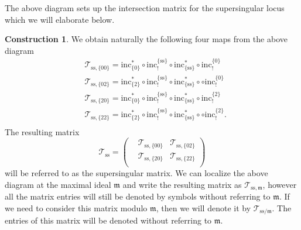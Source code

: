 \documentclass[10pt]{amsart}
\numberwithin{equation}{section}
\theoremstyle{definition}
\newtheorem{construction}[equation]{Construction}
\def\calT{\mathcal{T}}
\def\fracm{\mathfrak{m}}
\begin{document}
The above diagram sets up the intersection matrix for the supersingular locus which we will elaborate below.
\begin{construction}
We obtain naturally the following four maps from the above diagram
\begin{equation*}
\begin{aligned}
&\calT_{\mathrm{ss},\{00\}}= \mathrm{inc}^{\ast}_{\{0\}}\circ \mathrm{inc}^{\{\mathrm{ss}\}}_{!}\circ \mathrm{inc}^{\ast}_{\{\mathrm{ss}\}}\circ\mathrm{inc}^{\{0\}}_{!}\\
&\calT_{\mathrm{ss},\{02\}}= \mathrm{inc}^{\ast}_{\{2\}}\circ  \mathrm{inc}^{\{\mathrm{ss}\}}_{!}\circ \mathrm{inc}^{\ast}_{\{\mathrm{ss}\}}\circ\circ\mathrm{inc}^{\{0\}}_{!}\\
&\calT_{\mathrm{ss},\{20\}}= \mathrm{inc}^{\ast}_{\{0\}}\circ \mathrm{inc}^{\{\mathrm{ss}\}}_{!}\circ \mathrm{inc}^{\ast}_{\{\mathrm{ss}\}}\circ\mathrm{inc}^{\{2\}}_{!}\\
&\calT_{\mathrm{ss},\{22\}}= \mathrm{inc}^{\ast}_{\{2\}} \circ \mathrm{inc}^{\{\mathrm{ss}\}}_{!}\circ \mathrm{inc}^{\ast}_{\{\mathrm{ss}\}}\circ\circ\mathrm{inc}^{\{2\}}_{!}.\\
\end{aligned}
\end{equation*}
The resulting matrix
\begin{equation*}
\calT_{\mathrm{ss}}=\begin{pmatrix} &\calT_{\mathrm{ss},\{00\}} & \calT_{\mathrm{ss}, \{02\}}\\ &\calT_{\mathrm{ss}, \{20\}}& \calT_{\mathrm{ss}, \{22\}}\\ \end{pmatrix}
\end{equation*}
will be referred to as the supersingular matrix. We can localize the above diagram at the maximal ideal $\fracm$ and write the resulting matrix as $\calT_{\mathrm{ss},\fracm}$, however all the matrix entries will still be denoted by symbols without referring to $\fracm$. If we need to consider this matrix modulo $\fracm$, then we will denote it by $\calT_{\mathrm{ss}/\fracm}$. The entries of this matrix will be denoted without referring to $\fracm$.
\end{construction}
\end{document}
